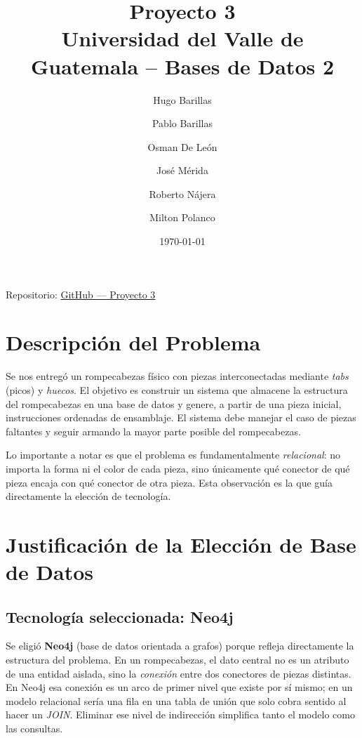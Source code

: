 \documentclass[12pt,a4paper]{article}
\title{
    \LARGE \textbf{Proyecto 3}\\[0.4em]
    \large Universidad del Valle de Guatemala -- Bases de Datos 2\\
}
\author{
    Hugo Barillas \and
    Pablo Barillas \and
    Osman De León \and
    José Mérida \and
    Roberto Nájera \and
    Milton Polanco
}
\date{\today}
\begin{document}
\maketitle

\begin{center}
    \small Repositorio: \href{https://github.com/DanielBarillasM/Proyecto-03_Eleccion-de-tecnologias-de-base-de-datos_BD2_seccion-20_Grupo-01}{GitHub — Proyecto 3}
\end{center}

\tableofcontents
\newpage

\section{Descripción del Problema}

Se nos entregó un rompecabezas físico con piezas interconectadas mediante
\emph{tabs} (picos) y \emph{huecos}. El objetivo es construir un sistema que
almacene la estructura del rompecabezas en una base de datos y genere, a partir
de una pieza inicial, instrucciones ordenadas de ensamblaje. El sistema debe
manejar el caso de piezas faltantes y seguir armando la mayor parte posible del
rompecabezas.

Lo importante a notar es que el problema es fundamentalmente \emph{relacional}:
no importa la forma ni el color de cada pieza, sino únicamente qué conector de
qué pieza encaja con qué conector de otra pieza. Esta observación es la que
guía directamente la elección de tecnología.

\section{Justificación de la Elección de Base de Datos}

\subsection{Tecnología seleccionada: Neo4j}

Se eligió \textbf{Neo4j} (base de datos orientada a grafos) porque refleja
directamente la estructura del problema. En un rompecabezas, el dato central no
es un atributo de una entidad aislada, sino la \emph{conexión} entre dos
conectores de piezas distintas. En Neo4j esa conexión es un arco de primer
nivel que existe por sí mismo; en un modelo relacional sería una fila en una
tabla de unión que solo cobra sentido al hacer un \textit{JOIN}. Eliminar ese
nivel de indirección simplifica tanto el modelo como las consultas.
\end{document}
